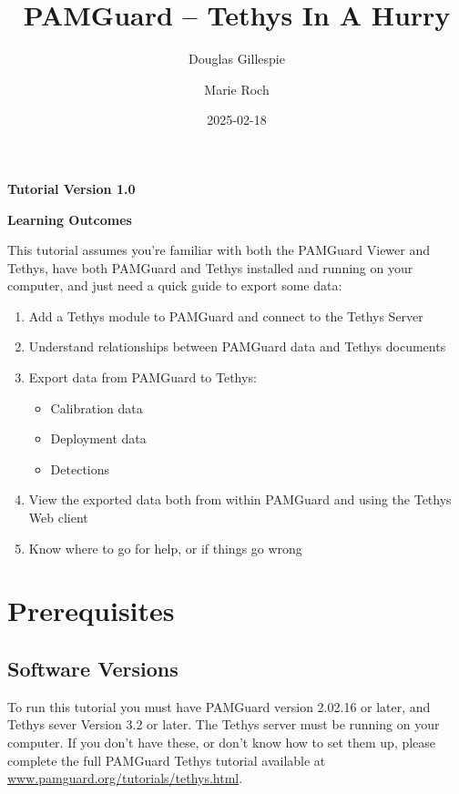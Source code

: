 \documentclass[
]{article}
\title{PAMGuard -- Tethys In A Hurry}
\author[1]{Douglas Gillespie}
\author[2]{Marie Roch}
\affil[1]{Sea Mammal Research Unit, University of St Andrews}
\affil[2]{Department of Computer Science, San Diego State University}
\date{2025-02-18}
\renewcommand*\contentsname{Table of contents}
\newcommand\contentsname{Table of contents}
\begin{document}
\maketitle

\centerline{\textbf{Tutorial Version 1.0}}
\vspace{3cm}

\centerline{\textbf{Learning Outcomes}}

This tutorial assumes you're familiar with both the PAMGuard Viewer and Tethys,
have both PAMGuard and Tethys installed and
running on your computer, and just need a quick guide to export some data:
\begin{enumerate}
\item Add a Tethys module to PAMGuard and connect to the Tethys Server
\item Understand relationships between PAMGuard data and Tethys documents
\item Export data from PAMGuard to Tethys:
\begin{itemize}
\item Calibration data
\item Deployment data
\item Detections
\end{itemize}
\item View the exported data both from within PAMGuard and using the Tethys Web client
\item Know where to go for help, or if things go wrong
\end{enumerate}
\newpage

\renewcommand*\contentsname{Table of contents}
{
\hypersetup{linkcolor=}
\setcounter{tocdepth}{3}
\tableofcontents
}
\listoffigures
\listoftables

\newpage{}

\pagestyle{plain}

\section{Prerequisites}\label{prerequisites}

\subsection{Software Versions}\label{software-versions}

To run this tutorial you must have PAMGuard version 2.02.16 or later,
and Tethys sever Version 3.2 or later. The Tethys server must be running
on your computer. If you don't have these, or don't know how to set them
up, please complete the full PAMGuard Tethys tutorial available at
\href{https://www.pamguard.org/tutorials/tethys.html}{www.pamguard.org/tutorials/tethys.html}.
\end{document}
